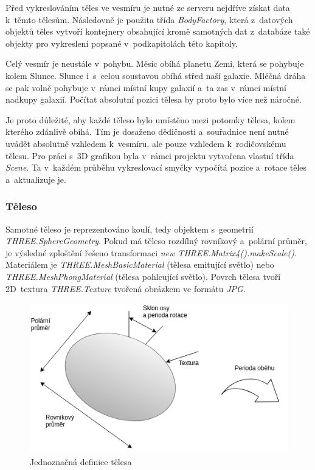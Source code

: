 \documentclass[a4paper,12pt]{article}
\begin{document}
Před vykreslováním těles ve vesmíru je nutné ze serveru nejdříve získat data k~těmto tělesům. Následovně je použita třída \textit{BodyFactory}, která z~datových objektů těles vytvoří kontejnery obsahující kromě samotných dat z~databáze také objekty pro vykreslení popsané v~podkapitolách této kapitoly.

Celý vesmír je neustále v~pohybu. Měsíc obíhá planetu Zemi, která se pohybuje kolem Slunce. Slunce i~s~celou soustavou obíhá střed naší galaxie. Mléčná dráha se pak volně pohybuje v~rámci místní kupy galaxií a~ta zas v~rámci místní nadkupy galaxií. \cite{kleczek}  Počítat absolutní pozici tělesa by proto bylo více než náročné.

Je proto důležité, aby každé těleso bylo umístěno mezi potomky tělesa, kolem kterého zdánlivě obíhá. Tím je dosaženo dědičnosti a~souřadnice není nutné uvádět absolutně vzhledem k~vesmíru, ale pouze vzhledem k~rodičovskému tělesu. Pro práci s~3D grafikou byla v~rámci projektu vytvořena vlastní třída \textit{Scene}. Ta v~každém průběhu vykreslovací smyčky vypočítá pozice a~rotace těles a~aktualizuje je.



\subsubsection{Těleso}

Samotné těleso je reprezentováno koulí, tedy objektem s~geometrií \textit{THREE.SphereGeometry}. Pokud má těleso rozdílný rovníkový a~polární průměr, je výsledné zploštění řešeno transformaci \textit{new THREE.Matrix4().makeScale()}. Materiálem je \textit{THREE.MeshBasicMaterial} (tělesa emitující světlo) nebo \textit{THREE.MeshPhongMaterial} (tělesa pohlcující světlo). Povrch tělesa tvoří 2D~textura \textit{THREE.Texture} tvořená obrázkem ve formátu \textit{JPG}.

\begin{figure}[H]
\begin{center}
\includegraphics[width=370pt]{Images/BodyData.png}
\caption[Jednoznačná definice tělesa]{Jednoznačná definice tělesa \footnotemark[1]}
\end{center}
\end{figure}
\end{document}
